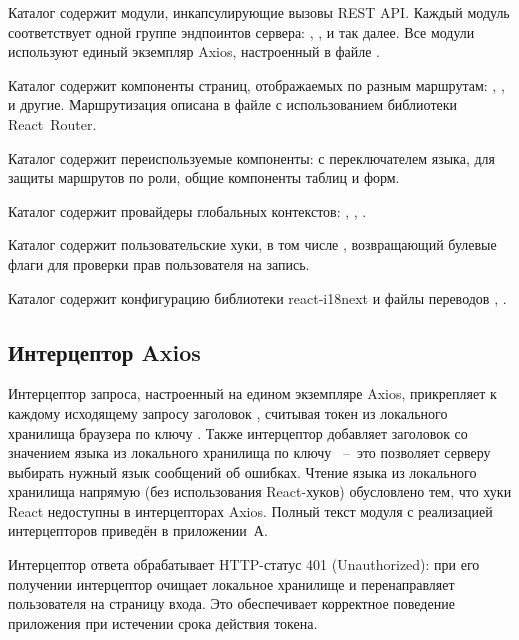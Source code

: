 Каталог  содержит модули, инкапсулирующие вызовы REST API.
Каждый модуль соответствует одной группе эндпоинтов сервера: , ,  и так далее.
Все модули используют единый экземпляр Axios, настроенный в файле .

Каталог  содержит компоненты страниц, отображаемых по разным маршрутам: , ,  и другие.
Маршрутизация описана в файле  с использованием библиотеки React~Router.

Каталог  содержит переиспользуемые компоненты:  с переключателем языка,  для защиты маршрутов по роли, общие компоненты таблиц и форм.

Каталог  содержит провайдеры глобальных контекстов: , , .

Каталог  содержит пользовательские хуки, в том числе , возвращающий булевые флаги для проверки прав пользователя на запись.

Каталог  содержит конфигурацию библиотеки react-i18next и файлы переводов , .

\subsection{Интерцептор Axios}

Интерцептор запроса, настроенный на едином экземпляре Axios, прикрепляет к каждому исходящему запросу заголовок , считывая токен из локального хранилища браузера по ключу .
Также интерцептор добавляет заголовок  со значением языка из локального хранилища по ключу ~--~это позволяет серверу выбирать нужный язык сообщений об ошибках.
Чтение языка из локального хранилища напрямую (без использования React-хуков) обусловлено тем, что хуки React недоступны в интерцепторах Axios.
Полный текст модуля  с реализацией интерцепторов приведён в приложении~А.

Интерцептор ответа обрабатывает HTTP-статус 401 (Unauthorized): при его получении интерцептор очищает локальное хранилище и перенаправляет пользователя на страницу входа.
Это обеспечивает корректное поведение приложения при истечении срока действия токена.

